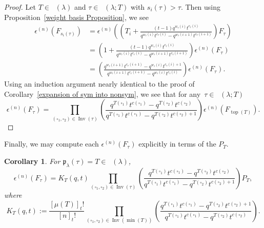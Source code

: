\documentclass[10pt,a4paper]{amsart}
\numberwithin{equation}{section}
\newtheorem{Corollary}[Theorem]{Corollary}
\theoremstyle{definition}
\DeclareMathOperator{\PSYT}{\mathrm{PSYT}_{\geq 0}}
\DeclareMathOperator{\RSSYT}{\mathrm{RSSYT}_{\geq 0}}
\DeclareMathOperator{\Inv}{\mathrm{Inv}}
\DeclareMathOperator{\Top}{\mathrm{top}}
\DeclareMathOperator{\Min}{\mathrm{min}}
\begin{document}
\begin{proof}
 Let $T \in \RSSYT(\lambda)$ and $\tau \in \PSYT(\lambda;T)$ with $s_i(\tau) > \tau$.
 Then using Proposition~\ref{weight basis Proposition}, we see
 \begin{align*}
 \epsilon^{(n)}(F_{s_i(\tau)})& = \epsilon^{(n)}\left( \left(T_i +\frac{(t-1)q^{w_{\tau}(i)}t^{c_{\tau}(i)}}{q^{w_{\tau}(i)}t^{c_{\tau}(i)} - q^{w_{\tau}(i+1)}t^{c_{\tau}(i+1)}} \right)F_{\tau}\right) \\
 & = \left(1+ \frac{(t-1)q^{w_{\tau}(i)}t^{c_{\tau}(i)}}{q^{w_{\tau}(i)}t^{c_{\tau}(i)} - q^{w_{\tau}(i+1)}t^{c_{\tau}(i+1)}} \right) \epsilon^{(n)}(F_{\tau}) \\
 &= \left( \frac{q^{w_{\tau}(i+1)}t^{c_{\tau}(i+1)}- q^{w_{\tau}(i)}t^{c_{\tau}(i)+1}}{q^{w_{\tau}(i+1)}t^{c_{\tau}(i+1)} - q^{w_{\tau}(i)}t^{c_{\tau}(i)}} \right) \epsilon^{(n)}(F_{\tau}).
 \end{align*}
 Using an induction argument nearly identical to the proof of Corollary~\ref{expansion of sym into nonsym}, we see that for any~${\tau \in \PSYT(\lambda;T)}$
 \[
 \epsilon^{(n)}(F_{\tau}) = \prod_{(\square_1,\square_2) \in \Inv(\tau)} \left( \frac{q^{T(\square_1)}t^{c(\square_1)} - q^{T(\square_2)}t^{c(\square_2) }}{q^{T(\square_1)}t^{c(\square_1)} - q^{T(\square_2)}t^{c(\square_2) +1}} \right) \epsilon^{(n)}(F_{\Top(T)}).\tag*{\qed}
 \] \renewcommand{\qed}{}
\end{proof}

Finally, we may compute each $\epsilon^{(n)}(F_{\tau})$ explicitly in terms of the $P_{T}$.

\begin{Corollary}\label{symmetrization coefficients in general}
 For $\mathfrak{p}_{\lambda}(\tau) = T \in \RSSYT(\lambda)$,
 \[
 \epsilon^{(n)}(F_{\tau}) = K_{T}(q,t)\prod_{(\square_1,\square_2) \in \Inv(\tau)} \left( \frac{q^{T(\square_1)}t^{c(\square_1)} - q^{T(\square_2)}t^{c(\square_2) }}{q^{T(\square_1)}t^{c(\square_1)} - q^{T(\square_2)}t^{c(\square_2) +1}} \right) P_T,
 \]
 where
 \[
 K_T(q,t):= \frac{[\mu(T)]_{t}!}{[n]_{t}!} \prod_{(\square_1,\square_2) \in \Inv(\Min(T))} \left( \frac{q^{T(\square_1)}t^{c(\square_1)} - q^{T(\square_2)}t^{c(\square_2) +1 }}{q^{T(\square_1)}t^{c(\square_1)} - q^{T(\square_2)}t^{c(\square_2)}} \right).
 \]

\end{Corollary}
\end{document}
